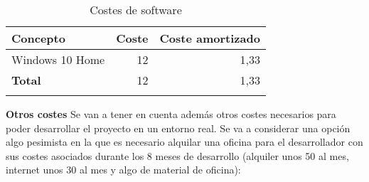 \begin{longtable}[]{@{}lrr@{}}
	\toprule
	\begin{minipage}[b]{0.29\columnwidth}\raggedright\strut
		\textbf{Concepto}\strut
	\end{minipage} & \begin{minipage}[b]{0.18\columnwidth}\raggedright\strut
		\textbf{Coste}\strut
	\end{minipage} & \begin{minipage}[b]{0.32\columnwidth}\raggedright\strut
		\textbf{Coste amortizado}\strut
	\end{minipage}\tabularnewline
	\midrule
	\endhead
	\begin{minipage}[t]{0.29\columnwidth}\raggedright\strut
		Windows 10 Home\strut
	\end{minipage} & \begin{minipage}[t]{0.18\columnwidth}\raggedright\strut
		12 \officialeuro\strut
	\end{minipage} & \begin{minipage}[t]{0.32\columnwidth}\raggedright\strut
		1,33 \officialeuro\strut
	\end{minipage}\tabularnewline
	\midrule
	\begin{minipage}[t]{0.29\columnwidth}\raggedright\strut
		\textbf{Total}\strut
	\end{minipage} & \begin{minipage}[t]{0.18\columnwidth}\raggedright\strut
		12 \officialeuro\strut
	\end{minipage} & \begin{minipage}[t]{0.32\columnwidth}\raggedright\strut
		1,33 \officialeuro\strut
	\end{minipage}\tabularnewline
	\bottomrule
	\caption{Costes de software}
\end{longtable}

\textbf{Otros costes}
Se van a tener en cuenta además otros costes necesarios para poder desarrollar el proyecto en un entorno real. Se va a considerar una opción algo pesimista en la que es necesario alquilar una oficina para el desarrollador con sus costes asociados durante los 8 meses de desarrollo (alquiler unos 50 \officialeuro al mes, internet unos 30 \officialeuro al mes y algo de material de oficina):\\

